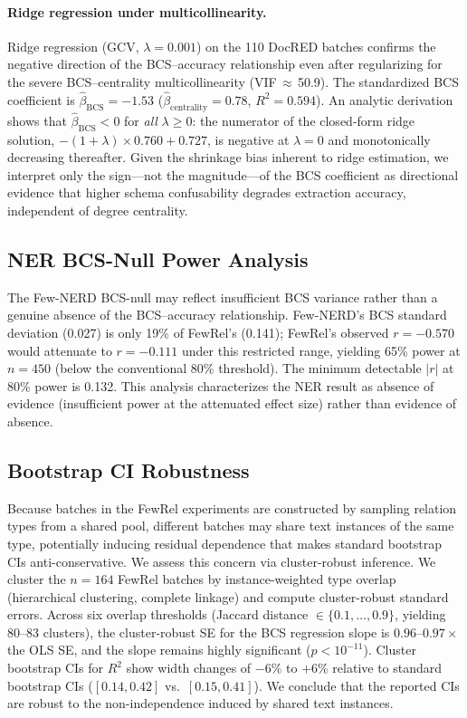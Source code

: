 \documentclass[11pt]{article}
\begin{document}
\paragraph{Ridge regression under multicollinearity.}
Ridge regression (GCV, $\lambda = 0.001$) on the 110 DocRED batches confirms the negative direction of the BCS--accuracy relationship even after regularizing for the severe BCS--centrality multicollinearity (VIF$\,\approx\,$50.9). The standardized BCS coefficient is $\hat{\beta}_{\text{BCS}} = -1.53$ ($\hat{\beta}_{\text{centrality}} = 0.78$, $R^2 = 0.594$). An analytic derivation shows that $\hat{\beta}_{\text{BCS}} < 0$ for \emph{all} $\lambda \geq 0$: the numerator of the closed-form ridge solution, $-(1{+}\lambda) \times 0.760 + 0.727$, is negative at $\lambda{=}0$ and monotonically decreasing thereafter. Given the shrinkage bias inherent to ridge estimation, we interpret only the sign---not the magnitude---of the BCS coefficient as directional evidence that higher schema confusability degrades extraction accuracy, independent of degree centrality.

\subsection{NER BCS-Null Power Analysis}
\label{sec:appendix_ner_power}

The Few-NERD BCS-null may reflect insufficient BCS variance rather than a genuine absence of the BCS--accuracy relationship. Few-NERD's BCS standard deviation (0.027) is only 19\% of FewRel's (0.141); FewRel's observed $r = -0.570$ would attenuate to $r = -0.111$ under this restricted range, yielding 65\% power at $n = 450$ (below the conventional 80\% threshold). The minimum detectable $|r|$ at 80\% power is 0.132. This analysis characterizes the NER result as absence of evidence (insufficient power at the attenuated effect size) rather than evidence of absence.

\subsection{Bootstrap CI Robustness}
\label{sec:appendix_bootstrap_ci}

Because batches in the FewRel experiments are constructed by sampling relation types from a shared pool, different batches may share text instances of the same type, potentially inducing residual dependence that makes standard bootstrap CIs anti-conservative. We assess this concern via cluster-robust inference. We cluster the $n = 164$ FewRel batches by instance-weighted type overlap (hierarchical clustering, complete linkage) and compute cluster-robust standard errors. Across six overlap thresholds (Jaccard distance $\in \{0.1, \ldots, 0.9\}$, yielding 80--83 clusters), the cluster-robust SE for the BCS regression slope is $0.96$--$0.97\times$ the OLS SE, and the slope remains highly significant ($p < 10^{-11}$). Cluster bootstrap CIs for $R^2$ show width changes of $-6\%$ to $+6\%$ relative to standard bootstrap CIs ($[0.14, 0.42]$ vs.\ $[0.15, 0.41]$). We conclude that the reported CIs are robust to the non-independence induced by shared text instances.
\end{document}
